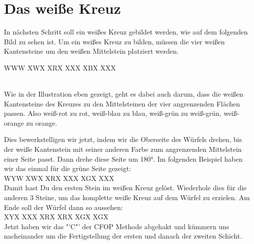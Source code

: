 \section{Das weiße Kreuz}
\parbox{0.7\linewidth}{
In nächsten Schritt soll ein weißes Kreuz gebildet werden, wie auf dem folgenden Bild zu sehen ist.
Um ein weißes Kreuz zu bilden, müssen die vier weißen Kantensteine um den weißen Mittelstein platziert werden.
}\parbox{0.3\linewidth}{
  \RubikCubeGreyAll%
	      {W}{W}{W}
	      {X}{W}{X}%
		 {X}{R}{X}
		 {X}{X}{X}%
		 {X}{B}{X}
		 {X}{X}{X}%
}\\[1em]

Wie in der Illustration eben gezeigt, geht es dabei auch darum, dass die weißen Kantensteine des Kreuzes zu den Mittelsteinen der vier angrenzenden Flächen passen.
Also weiß-rot zu rot, weiß-blau zu blau, weiß-grün zu weiß-grün, weiß-orange zu orange.

Dies bewerkstelligen wir jetzt, indem wir die Oberseite des Würfels drehen, bis der weiße Kantenstein mit seiner anderen Farbe zum angrenzenden Mittelstein einer Seite passt.
Dann drehe diese Seite um 180°.
Im folgenden Beispiel haben wir das einmal für die grüne Seite gezeigt:\\[1em]

\RubikCubeGreyAll%
            {W}{Y}{W}
            {X}{W}{X}%
               {X}{R}{X}
	       {X}{X}{X}%
	       {X}{G}{X}
	       {X}{X}{X}%
\quad{}
\quad{}
\\[1em]

Damit hast Du den ersten Stein im weißen Kreuz gelöst.
Wiederhole dies für die anderen 3 Steine, um das komplette weiße Kreuz auf dem Würfel zu erzielen.
Am Ende soll der Würfel dann so aussehen:\\[1em]
\RubikCubeGreyAll%
            {X}{Y}{X}
            {X}{X}{X}%
               {X}{R}{X}
	       {X}{R}{X}%
	       {X}{G}{X}
	       {X}{G}{X}%
\\[1em]

Jetzt haben wir das "'C"' der CFOP Methode abgehakt und kümmern uns nacheinander um die
Fertigstellung der ersten und danach der zweiten Schicht.
